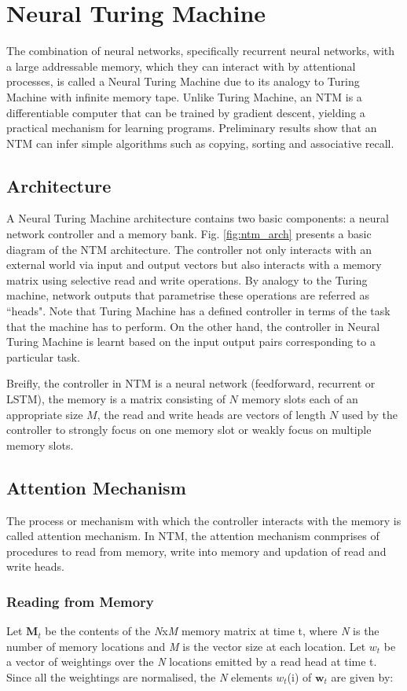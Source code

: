 \chapter{Neural Turing Machine}
The combination of neural networks, specifically recurrent neural networks, with a large addressable memory, which they can interact with by attentional processes, is called a Neural Turing Machine due to its analogy to Turing Machine with infinite memory tape. Unlike Turing Machine, an NTM is a differentiable computer that can be trained by gradient descent, yielding a practical mechanism for learning programs. \cite{ntm} Preliminary results show that an NTM can infer simple algorithms such as copying, sorting and associative recall.

\section{Architecture}
A Neural Turing Machine architecture contains two basic components: a neural network controller and a memory bank. Fig. \ref{fig:ntm_arch} presents a basic diagram of the NTM architecture. The controller not only interacts with an external world via input and output vectors but also interacts with a memory matrix using selective read and write operations. By analogy to the Turing machine, network outputs that parametrise these operations are referred as ``heads".
Note that Turing Machine has a defined controller in terms of the task that the machine has to perform. On the other hand, the controller in Neural Turing Machine is learnt based on the input output pairs corresponding to a particular task.

Breifly, the controller in NTM is a neural network (feedforward, recurrent or LSTM), the memory is a matrix consisting of $N$ memory slots each of an appropriate size $M$, the read and write heads are vectors of length $N$ used by the controller to strongly focus on one memory slot or weakly focus on multiple memory slots.

\section{Attention Mechanism}
The process or mechanism with which the controller interacts with the memory is called attention mechanism. In NTM, the attention mechanism conmprises of procedures to read from memory, write into memory and updation of read and write heads.

\subsection{Reading from Memory}
Let $\textbf{M}_t$ be the contents of the \textit{N}x\textit{M} memory matrix at time t, where \textit{N} is the number of memory locations and \textit{M} is the vector size at each location. Let $w_t$ be a vector of weightings over the \textit{N} locations emitted by a read head at time t. Since all the weightings are normalised, the \textit{N} elements $w_t$(i) of $\textbf{w}_t$ are given by:


